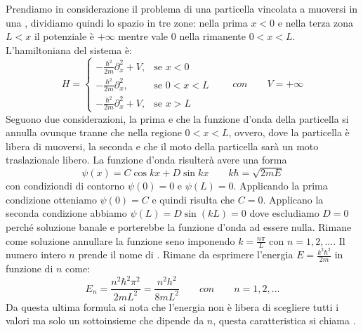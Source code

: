 Prendiamo in considerazione il problema di una particella vincolata a muoversi in una , dividiamo quindi lo spazio in tre zone: nella prima $x < 0$ e nella terza zona $L < x$ il potenziale è $+\infty$ mentre vale $0$ nella rimanente $0 < x < L$. L'hamiltoniana del sistema è:
$$H=\begin{cases}
 - \frac{\hbar^2}{2m} \partial_x^2 + V, & \mbox{se } x<0   \\
 - \frac{\hbar^2}{2m} \partial_x^2,     & \mbox{se } 0<x<L \\
 - \frac{\hbar^2}{2m} \partial_x^2 + V, & \mbox{se } x>L
\end{cases} \qquad con \qquad V = +\infty$$
Seguono due considerazioni, la prima e che la funzione d'onda della particella si annulla ovunque tranne che nella regione $0 < x < L$, ovvero, dove la particella è libera di muoversi, la seconda e che il moto della particella sarà un moto traslazionale libero. La funzione d'onda risulterà avere una forma
$$\psi(x) = C \cos{kx} + D \sin{kx} \qquad k\hbar = \sqrt{2mE}$$
con condiziondi di contorno $\psi(0) = 0$ e $\psi(L) = 0$. Applicando la prima condizione otteniamo $\psi(0) = C$ e quindi risulta che $C = 0$. Applicano la seconda condizione abbiamo $\psi(L) = D \sin(kL) = 0$ dove escludiamo $D = 0$ perché soluzione banale e porterebbe la funzione d'onda ad essere nulla. Rimane come soluzione annullare la funzione seno imponendo $k = \frac{n\pi}{L}$ con $n = 1, 2, ...$. Il numero intero $n$ prende il nome di . Rimane da esprimere l'energia $E = \frac{k^2 \hbar^2}{2m}$ in funzione di $n$ come:
$$E_n = \frac{n^2 \hbar^2 \pi^2}{2 m L^2} = \frac{n^2 h^2}{8 m L^2} \qquad con \qquad n = 1, 2, ...$$
Da questa ultima formula si nota che l'energia non è libera di scegliere tutti i valori ma solo un sottoinsieme che dipende da $n$, questa caratteristica si chiama .

